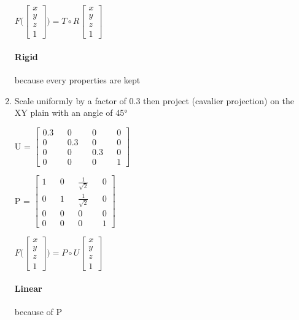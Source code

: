 \documentclass{article}
\begin{document}
\begin{enumerate}
        $F \Bigg (\begin{bmatrix}
            x \\ y \\ z \\ 1
        \end{bmatrix} \Bigg ) =  T \circ R \begin{bmatrix}
            x \\ y \\ z \\ 1
        \end{bmatrix}$ 

        \paragraph{Rigid} because every properties are kept

        \item Scale uniformly by a factor of 0.3 then project (cavalier projection) on the XY plain with an angle of 45°
        
        U = $\begin{bmatrix}
            0.3 && 0 && 0 && 0 \\ 
            0 && 0.3 && 0 && 0 \\ 
            0 && 0 && 0.3 && 0 \\ 
            0 && 0 && 0 && 1 
        \end{bmatrix}$

        P = $\begin{bmatrix}
            1 && 0 && \frac{1}{\sqrt{2}} && 0 \\ 
            0 && 1 && \frac{1}{\sqrt{2}} && 0 \\ 
            0 && 0 && 0 && 0 \\ 
            0 && 0 && 0 && 1 
        \end{bmatrix}$

        $F \Bigg (\begin{bmatrix}
            x \\ y \\ z \\ 1
        \end{bmatrix} \Bigg ) = P \circ U  \begin{bmatrix}
            x \\ y \\ z \\ 1
        \end{bmatrix}$ 

        \paragraph{Linear} because of P

    \end{enumerate}
\end{document}
